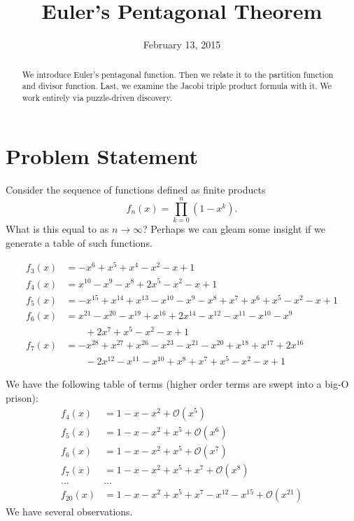 \documentclass{article}
\title{Euler's Pentagonal Theorem}
\date{February 13, 2015}
\begin{document}
\maketitle
\begin{abstract}
  We introduce Euler's pentagonal function. Then we relate it to the
  partition function and divisor function. Last, we examine the Jacobi
  triple product formula with it. We work entirely via puzzle-driven
  discovery. 
\end{abstract}
\tableofcontents

\section{Problem Statement}
Consider the sequence of functions defined as finite products
\begin{equation}
  f_{n}(x) = \prod^{n}_{k=0}(1-x^{k}).
\end{equation}
What is this equal to as $n\to\infty$? Perhaps we can gleam some insight
if we generate a table of such functions.

\begin{align}
  f_{3}(x) &= - x^{6} + x^{5} + x^{4} - x^{2} - x + 1\\
  f_{4}(x) &= x^{10} - x^{9} - x^{8} + 2x^{5} - x^{2} - x + 1\\
  f_{5}(x) &= -x^{15} + x^{14} + x^{13} - x^{10} - x^{9} - x^{8} + x^{7} + x^{6} + x^{5} - x^{2} - x + 1\\
  f_{6}(x) &= x^{21} - x^{20} - x^{19} + x^{16} + 2x^{14} - x^{12} - x^{11} - x^{10} - x^{9}\nonumber\\
  &\qquad + 2x^{7} + x^{5} - x^{2} - x + 1\\
  f_{7}(x) &= -x^{28} + x^{27} + x^{26} - x^{23} - x^{21} - x^{20} +
  x^{18} + x^{17} + 2x^{16}\nonumber\\
&\qquad- 2x^{12} - x^{11} - x^{10} + x^{8} + x^{7} + x^{5} - x^{2} - x + 1
\end{align}


\M We have the following table of terms (higher order terms are swept
into a big-O prison):
\begin{align}
f_{4}(x) &= 1- x - x^{2} + \mathcal{O}(x^{5})\\
f_{5}(x) &= 1 -x - x^{2} + x^{5} + \mathcal{O}(x^{6}) \\
f_{6}(x) &= 1 -x - x^{2} + x^{5} + \mathcal{O}(x^{7}) \\
f_{7}(x) &= 1 -x - x^{2} + x^{5} + x^{7} + \mathcal{O}(x^{8}) \\
\dots & \dots \\
f_{20}(x) &= 1 - x - x^{2} + x^{5} + x^{7} - x^{12} - x^{15} + \mathcal{O}(x^{21})
\end{align}
We have several observations.
\end{document}
